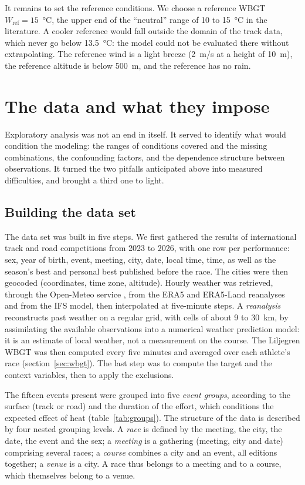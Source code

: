 \documentclass[11pt,a4paper]{article}
\begin{document}
It remains to set the reference conditions. We choose a reference WBGT $W_{\text{ref}} = 15$~°C, the upper end of the
``neutral'' range of 10 to 15~°C in the literature. A cooler reference would fall outside the domain of the track
data, which never go below 13.5~°C: the model could not be evaluated there without extrapolating. The reference wind
is a light breeze (2~m/s at a height of 10~m), the reference altitude is below 500~m, and the reference has no rain.

\section{The data and what they impose}\label{sec:data}

Exploratory analysis was not an end in itself. It served to identify what would condition the modeling: the ranges
of conditions covered and the missing combinations, the confounding factors, and the dependence structure between
observations. It turned the two pitfalls anticipated above into measured difficulties, and brought a third one to
light.

\subsection{Building the data set}\label{sec:dataset}

The data set was built in five steps. We first gathered the results of international track and road competitions
from 2023 to 2026, with one row per performance: sex, year of birth, event, meeting, city, date, local time, time, as
well as the season's best and personal best published before the race. The cities were then geocoded (coordinates,
time zone, altitude). Hourly weather was retrieved, through the Open-Meteo service \citep{zippenfenig2023}, from the
ERA5 \citep{hersbach2020} and ERA5-Land reanalyses and from the IFS model, then interpolated at five-minute steps. A
\emph{reanalysis} reconstructs past weather on a regular grid, with cells of about 9 to 30~km, by assimilating the
available observations into a numerical weather prediction model: it is an estimate of local weather, not a
measurement on the course. The Liljegren WBGT was then computed every five minutes and averaged over each athlete's
race (section~\ref{sec:wbgt}). The last step was to compute the target and the context variables, then to apply the
exclusions.

The fifteen events present were grouped into five \emph{event groups}, according to the surface (track or road) and
the duration of the effort, which conditions the expected effect of heat (table~\ref{tab:groups}). The structure of
the data is described by four nested grouping levels. A \emph{race} is defined by the meeting, the city, the date, the
event and the sex; a \emph{meeting} is a gathering (meeting, city and date) comprising several races; a \emph{course}
combines a city and an event, all editions together; a \emph{venue} is a city. A race thus belongs to a meeting and to
a course, which themselves belong to a venue.
\end{document}
